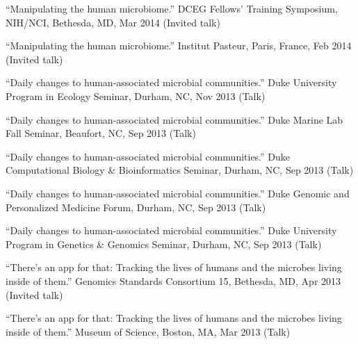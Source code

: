 \documentclass[overlapped,line,11pt]{res}
\begin{document}
\begin{resume}
\begin{revnumerate}[26]

\item {``Manipulating the human microbiome.''
  DCEG Fellows’ Training Symposium, NIH/NCI, Bethesda, MD, Mar 2014
  (Invited talk)}
\vspace*{0mm}

\item {``Manipulating the human microbiome.''
  Institut Pasteur,
  Paris, France, Feb 2014 (Invited talk)}
\vspace*{0mm}

\item {``Daily changes to human-associated microbial communities.''
  Duke University Program in Ecology Seminar,
  Durham, NC, Nov 2013 (Talk)}
\vspace*{0mm}

\item {``Daily changes to human-associated microbial communities.''
  Duke Marine Lab Fall Seminar,
  Beaufort, NC, Sep 2013 (Talk)}
\vspace*{0mm}

\item {``Daily changes to human-associated microbial communities.''
  Duke Computational Biology \& Bioinformatics Seminar,
  Durham, NC, Sep 2013 (Talk)}
\vspace*{0mm}

\item {``Daily changes to human-associated microbial communities.''
  Duke Genomic and Personalized Medicine Forum,
  Durham, NC, Sep 2013 (Talk)}
\vspace*{0mm}

\item {``Daily changes to human-associated microbial communities.''
  Duke University Program in Genetics \& Genomics Seminar,
  Durham, NC, Sep 2013 (Talk)}
\vspace*{0mm}

\item {``There's an app for that: Tracking the lives of humans and the
  microbes living inside of them.'' Genomics Standards Consortium 15,
  Bethesda, MD, Apr 2013 (Invited talk)}
\vspace*{0mm}

\item {``There's an app for that: Tracking the lives of humans and
  the microbes living inside of them.'' Museum of Science, Boston,
  MA, Mar 2013 (Talk)}
\vspace*{0mm}


\end{revnumerate}
\end{resume}
\end{document}
